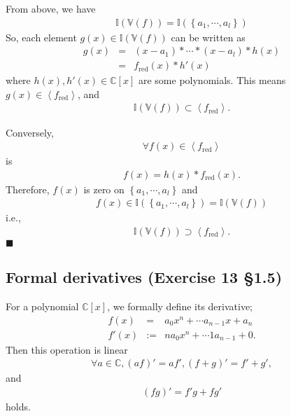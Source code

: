 \documentclass[11pt]{book}
\begin{document}
From above, we have
\begin{eqnarray}
\mathbb{I}\left( \mathbb{V}(f) \right)
=
\mathbb{I}\left( \left\{a_1, \cdots, a_l \right\} \right)
\end{eqnarray}
So, each element $g(x) \in \mathbb{I}\left( \mathbb{V}(f) \right)$ can be written as
\begin{eqnarray}
g(x) &=& (x -a_1) *\cdots * (x-a_l) * h(x) \\
&=& f_\text{red}(x) * h'(x)
\end{eqnarray}
where $h(x), h'(x) \in  \mathbb{C}[x]$ are some polynomials.
This means $g(x) \in \left< f_\text{red} \right>$, and
\begin{eqnarray}
\mathbb{I}\left( \mathbb{V}(f) \right) \subset \left< f_\text{red} \right>.
\end{eqnarray}

Conversely,
\begin{eqnarray}
\forall f(x) \in \left< f_\text{red} \right>
\end{eqnarray}
is 
\begin{eqnarray}
f(x) = h(x) * f_\text{red}(x).
\end{eqnarray}
Therefore, $f(x)$ is zero on $ \left\{a_1, \cdots, a_l \right\}$ and
\begin{eqnarray}
f(x) \in \mathbb{I}\left( \left\{a_1, \cdots, a_l \right\} \right) = \mathbb{I}\left( \mathbb{V}(f) \right)
\end{eqnarray}
i.e.,
\begin{eqnarray}
\mathbb{I}\left( \mathbb{V}(f) \right) \supset \left< f_\text{red} \right>.
\end{eqnarray}
$\blacksquare$

\subsection{Formal derivatives (Exercise 13 \S1.5)}
For a polynomial $\mathbb{C}[x]$, we formally define its derivative;
\begin{eqnarray}
f(x) &=& a_0x^n + \cdots a_{n-1}x + a_n \\
f'(x) &:=& na_0x^n + \cdots 1a_{n-1} + 0.
\end{eqnarray}
Then this operation is linear
\begin{eqnarray}
\forall a\in \mathbb{C}, (af)' = af', (f+g)' = f' + g',
\end{eqnarray}
and
\begin{eqnarray}
(fg)' = f'g + fg'
\end{eqnarray}
holds.
\end{document}
